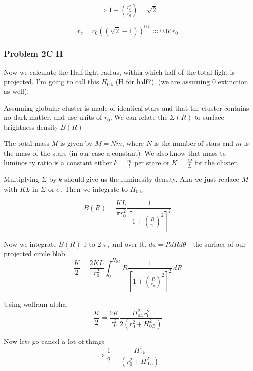 \begin{equation}
\Rightarrow 1 + \left(\tfrac{r_c^2}{r_0^2}\right) = \sqrt{2}
\end{equation}


\begin{equation}
\boxed{r_c = r_0((\sqrt{2} -1 ))^{0.5}} \approx 0.64r_0
\end{equation}


\subsubsection*{Problem 2C II}
Now we calculate the Half-light radius, within which half of the total light is projected. I'm going to call this $H_{0.5}$ (H for half?). (we are assuming 0 extinction as well).

Assuming globular cluster is made of identical stars and that the cluster contains no dark matter, and use units of $r_0$.  We can relate the $\Sigma(R)$ to surface brightness density $B(R)$. 

The total mass $M$ is given by $ M = Nm$, where $N$ is the number of stars and $m$ is the mass of the stars (in our case a constant). We also know that mass-to-luminosity ratio is a constant either $k = \frac{m}{l}$ per stare or $K = \frac{M}{L}$ for the cluster.

Multiplying $\Sigma$ by $k$ should give us the luminosity density. Aka we just replace $M$ with $KL$ in $\Sigma $ or $\sigma$. Then we integrate to $H_{0.5}$. 

\begin{equation}
B(R) = \frac{KL}{\pi r_0^2}\frac{1}{\left[1 + \left(\tfrac{R}{r_0}\right)^2\right]^2}
\end{equation}

Now we integrate $B(R)$ $0$ to $2$ $\pi$, and over R. $da = RdRd\theta$ - the surface of our projected circle blob. 
\begin{equation}
\frac{K}{2} = \frac{2KL}{ r_0^2} \int_{0}^{H_{0.5}} R\frac{1}{\left[1 + \left(\tfrac{R}{r_0}\right)^2\right]^2} \, dR
\end{equation}

Using wolfram alpha:
\begin{equation}
\frac{K}{2} =   \frac{2K}{r_0^2} \frac{H_{0.5}^2r_0^2}{2(r_0^2 + H_{0.5}^2)}
\end{equation}

Now lets go cancel a lot of things
\begin{equation}
    \Rightarrow \frac{1}{2} = \frac{H_{0.5}^2}{(r_0^2 + H_{0.5}^2)}
\end{equation}

